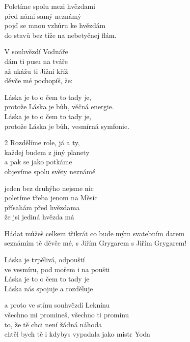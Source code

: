 
\ve{}
Poletíme spolu mezi hvězdami\\
před námi samý neznámý\\
pojď se mnou vzhůru ke hvězdám\\
do stavů bez tíže na nebetyčnej flám.

V souhvězdí Vodnáře\\
dám ti pusu na tváře\\
až ukážu ti Jižní kříž\\
děvče mé pochopíš, že:

\cho{}
Láska je to o čem to tady je,\\
protože Láska je bůh, věčná energie.\\
Láska je to o čem to tady je,\\
protože Láska je bůh, vesmírná symfonie.

\ve{}
\begin{multicols}{2}
Rozdělíme role, já a ty,\\
každej budem z jiný planety\\
a pak se jako potkáme\\
objevíme spolu světy neznámé

\columnbreak
jeden bez druhýho nejsme nic\\
poletíme třeba jenom na Měsíc\\
přísahám před hvězdama\\
že jsi jediná hvězda má
\end{multicols}

\cho{}

\re{*:}
Hádat můžeš celkem třikrát co bude mým svatebním darem\\
seznámím tě děvče mé, s Jiřím Grygarem s Jiřím Grygarem!

\cho{}

\ve{}
Láska je trpělivá, odpouští\\
ve vesmíru, pod mořem i na poušti\\
Láska je to o čem to tady je\\
Láska nás spojuje a rozděluje

a proto ve stínu souhvězdí Leknínu\\
všechno mi promineš, všechno ti prominu \\
to, že tě chci není žádná náhoda\\
chtěl bych tě i kdybys vypadala jako mistr Yoda

\cho{}


\esong{}